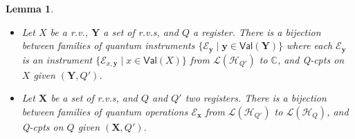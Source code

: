 \documentclass[10pt,a4paper]{article}
\newcommand*{\setofrv}[1]{\mathsf{Val}(#1)}
\newcommand{\bX}{\mathbf X}
\newcommand{\bY}{\mathbf Y}
\newcommand{\bx}{{\mathbf x}}
\newcommand{\by}{{\mathbf y}}
\renewcommand{\L}{\mathcal{L}}
\newcommand{\Eop}{\mathcal E}
\newcommand*{\C}{\mathbb{C}}
\newcommand{\HH}{\mathcal{H}}
\newcommand{\reg}{Q}
\newcommand{\qreg}{\reg}
\newcommand{\rv}{r.v.\xspace}
\newcommand{\rvs}{r.v.s\xspace}
\newcommand*{\qCPTs}{Q-\textsf{cpt}s\xspace}
\newtheorem{lemma}[theorem]{Lemma}
\begin{document}
\begin{lemma}
\label{lem:qcpt_qi}
\hfill
\begin{itemize}
\item
Let $X$ be a \rv, $\bY$ a set of \rvs, and $\qreg$ a register.
There is a bijection between families of quantum instruments $\{\Eop_\by \mid \by\in\setofrv{\bY}\}$ where each $\Eop_\by$ is an instrument $\{\Eop_{x,\by} \mid x\in\setofrv{X}\}$ from $\L(\HH_{\qreg'})$ to $\C$, and \qCPTs on $X$ given $(\bY,\qreg')$.
\item
Let $\bX$ be a set of \rvs, and $\qreg$ and $\qreg'$ two registers.
There is a bijection between families of quantum operations $\Eop_\bx$ from $\L(\HH_{\qreg'})$ to $\L(\HH_\qreg)$, and \qCPTs on $\qreg$ given $(\bX,\qreg')$.
\end{itemize}
\end{lemma}
\end{document}
